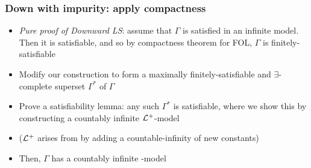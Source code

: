 \begin{frame}
\frametitle{Down with impurity: apply compactness}

\begin{itemize}[<+->]

\item \textit{Pure proof of Downward LS}: assume that $\Gamma$ is satisfied in an infinite model. Then it is satisfiable, and so by compactness theorem for FOL,  $\Gamma$ is finitely-satisfiable

\item Modify our construction to form a maximally finitely-satisfiable and $\exists$-complete superset $\Gamma^{\ast}$ of $\Gamma$ 

\item Prove a satisfiability lemma: any such $\Gamma^{\ast}$ is satisfiable, where we show this by constructing a countably infinite $\mathcal{L}^+$-model 
\item[] ($\mathcal{L}^+$ arises from  by adding a countable-infinity of new constants)


\item Then, $\Gamma$ has a countably infinite -model



\end{itemize}
\end{frame}

